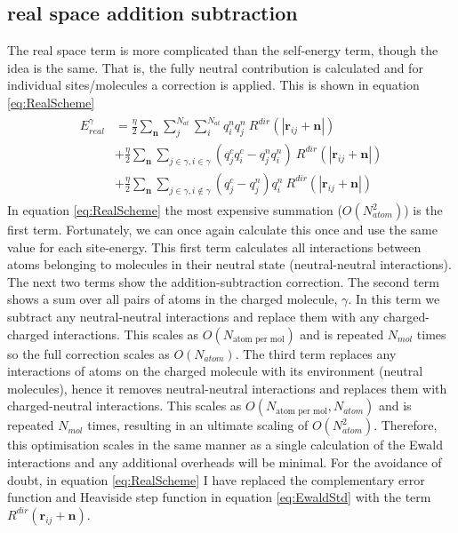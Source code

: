 \subsection{real space addition subtraction}
The real space term is more complicated than the self-energy term, though the idea is the same. That is, the fully neutral contribution is calculated and for individual sites/molecules a correction is applied. This is shown in equation \eqref{eq:RealScheme}
\begin{align}
  \begin{split}
	  E^{\gamma}_{real} &= \frac{\eta}{2} \sum_{\mathbf{n}} \sum_{j}^{N_{at}} \sum_{i}^{N_{at}} q^{n}_i q^{n}_j  \ R^{dir}(|\mathbf{r}_{ij} + \mathbf{n}|) \\
	  &+ \frac{\eta}{2} \sum_{\mathbf{n}} \sum_{j \in \gamma, i \in \gamma} (q_j^c q_i^c - q_j^n q_i^n) \ R^{dir}(|\mathbf{r}_{ij} + \mathbf{n}|) \\
	  &+ \frac{\eta}{2} \sum_{\mathbf{n}} \sum_{j \in \gamma, i \not\in \gamma} (q_j^c - q_j^n)q_i^n \ R^{dir}(|\mathbf{r}_{ij} + \mathbf{n}|) 
  \end{split}
  \label{eq:RealScheme}
\end{align}
In equation \eqref{eq:RealScheme} the most expensive summation ($O(N_{atom}^2)$) is the first term. Fortunately, we can once again calculate this once and use the same value for each site-energy. This first term calculates all interactions between atoms belonging to molecules in their neutral state (neutral-neutral interactions). The next two terms show the addition-subtraction correction. The second term shows a sum over all pairs of atoms in the charged molecule, $\gamma$. In this term we subtract any neutral-neutral interactions and replace them with any charged-charged interactions. This scales as $O(N_{\text{atom per mol}})$ and is repeated $N_{mol}$ times so the full correction scales as $O(N_{atom})$. The third term replaces any interactions of atoms on the charged molecule with its environment (neutral molecules), hence it removes neutral-neutral interactions and replaces them with charged-neutral interactions. This scales as $O(N_{\text{atom per mol}}, N_{atom})$ and is repeated $N_{mol}$ times, resulting in an ultimate scaling of $O(N_{atom}^2)$. Therefore, this optimisation scales in the same manner as a single calculation of the Ewald interactions and any additional overheads will be minimal. For the avoidance of doubt, in equation \eqref{eq:RealScheme} I have replaced the complementary error function and Heaviside step function in equation \eqref{eq:EwaldStd} with the term $R^{dir}(\mathbf{r}_{ij} + \mathbf{n})$.
